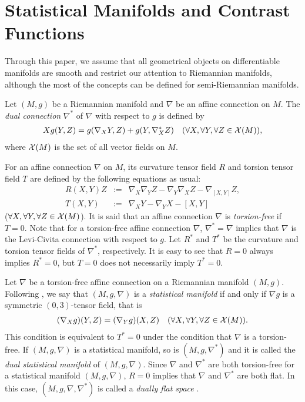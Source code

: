 \documentclass[graybox]{svmult}
\begin{document}
\section{Statistical Manifolds and Contrast Functions}
\label{sec:2}
Through this paper, we assume that all geometrical objects on differentiable manifolds are
smooth and restrict our attention to Riemannian manifolds, although the most of the concepts
can be defined for semi-Riemannian manifolds.

Let $(M,g)$ be a Riemannian manifold and $\nabla$ be an affine connection on $M$. The {\em
dual connection} $\nabla^{\ast}$ of $\nabla$ with respect to $g$ is defined by
%
\begin{eqnarray*}
   Xg(Y,Z) = g(\nabla_{X}Y, Z) + g(Y, \nabla^{\ast}_{X}Z) \ \ \
   (\forall X,\forall Y,\forall Z \in {\cal X}(M)),
\end{eqnarray*}
%
where ${\cal X}(M)$ is the set of all vector fields on $M$.

For an affine connection $\nabla$ on $M$, its curvature tensor field $R$ and torsion tensor
field $T$ are defined by the following equations as usual:
%
\begin{eqnarray*}
   R(X,Y)Z &:=& \nabla_{X}\nabla_{Y}Z - \nabla_{Y}\nabla_{X}Z - \nabla_{[X,Y]}Z, \\
   T(X,Y) &:=& \nabla_{X}Y - \nabla_{Y}X - [X,Y]
\end{eqnarray*}
%
($\forall X,\forall Y,\forall Z \in {\cal X}(M)$).
It is said that an affine connection $\nabla$ is {\em torsion-free} if $T=0$.
Note that for a torsion-free affine connection $\nabla$, $\nabla^{\ast}=\nabla$ implies
that $\nabla$ is the Levi-Civita connection with respect to $g$.
Let $R^{\ast}$ and $T^{\ast}$ be the curvature and torsion tensor fields of
$\nabla^{\ast}$, respectively. It is easy to see that $R=0$ always implies $R^{\ast}=0$,
but $T=0$ does not necessarily imply $T^{\ast}=0$.

Let $\nabla$ be a torsion-free affine connection on a Riemannian manifold $(M,g)$.
Following \cite{Ku1},
we say that $(M,g,\nabla)$ is a {\em statistical manifold} if and only if $\nabla g$ is a
symmetric $(0,3)$-tensor field, that is
%
\begin{eqnarray}\label{SM}
   (\nabla_{X}g)(Y,Z) = (\nabla_{Y}g)(X,Z) \ \ \ (\forall X,\forall Y,\forall Z \in {\cal X}(M)).
\end{eqnarray}
%
This condition is equivalent to $T^{\ast}=0$ under the condition that $\nabla$ is a torsion-free.
If $(M,g,\nabla)$ is a statistical manifold, so is $(M,g,\nabla^{\ast})$ and it is called the
{\em dual statistical manifold} of $(M,g,\nabla)$. Since $\nabla$ and $\nabla^{\ast}$ are both
torsion-free for a statistical manifold $(M,g,\nabla)$, $R=0$ implies that
$\nabla$ and $\nabla^{\ast}$ are both flat. In this case, $(M,g,\nabla,\nabla^{\ast})$ is called
a {\em dually flat space} \cite{AN}.
\end{document}
